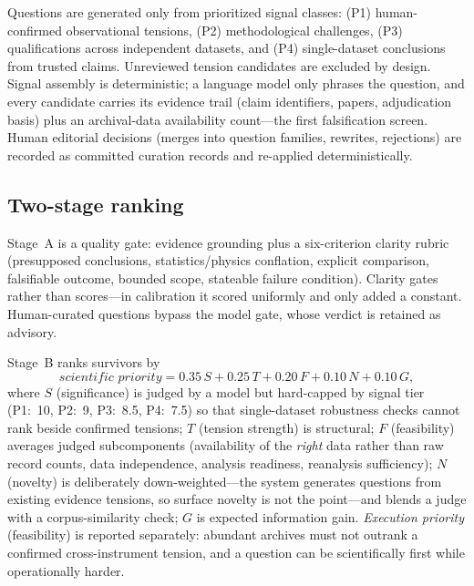Questions are generated only from prioritized signal classes:
(P1) human-confirmed observational tensions, (P2) methodological
challenges, (P3) qualifications across independent datasets, and
(P4) single-dataset conclusions from trusted claims. Unreviewed tension
candidates are excluded by design. Signal assembly is deterministic;
a language model only phrases the question, and every candidate carries
its evidence trail (claim identifiers, papers, adjudication basis) plus
an archival-data availability count---the first falsification screen.
Human editorial decisions (merges into question families, rewrites,
rejections) are recorded as committed curation records and re-applied
deterministically.

\subsection{Two-stage ranking}
\label{sec:framework:ranking}

Stage~A is a quality gate: evidence grounding plus a six-criterion
clarity rubric (presupposed conclusions, statistics/physics conflation,
explicit comparison, falsifiable outcome, bounded scope, stateable
failure condition). Clarity gates rather than scores---in calibration it
scored uniformly and only added a constant. Human-curated questions
bypass the model gate, whose verdict is retained as advisory.

Stage~B ranks survivors by
\[
\textit{scientific priority} =
0.35\,S + 0.25\,T + 0.20\,F + 0.10\,N + 0.10\,G,
\]
where $S$ (significance) is judged by a model but hard-capped by signal
tier (P1:~10, P2:~9, P3:~8.5, P4:~7.5) so that single-dataset robustness
checks cannot rank beside confirmed tensions; $T$ (tension strength) is
structural; $F$ (feasibility) averages judged subcomponents
(availability of the \emph{right} data rather than raw record counts,
data independence, analysis readiness, reanalysis sufficiency);
$N$ (novelty) is deliberately down-weighted---the system generates
questions from existing evidence tensions, so surface novelty is not the
point---and blends a judge with a corpus-similarity check; $G$ is
expected information gain. \emph{Execution priority} (feasibility) is
reported separately: abundant archives must not outrank a confirmed
cross-instrument tension, and a question can be scientifically first
while operationally harder.
